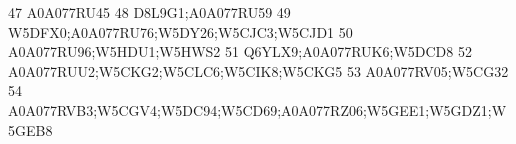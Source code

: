 \documentclass{beamer}
\begin{document}
\begin{frame}[fragile]
\begin{itemize}
\begin{Schunk}
\begin{Soutput}
47                                                                                                                                                                                                                                                                                                                                                                     A0A077RU45
48                                                                                                                                                                                                                                                                                                                                                              D8L9G1;A0A077RU59
49                                                                                                                                                                                                                                                                                                                                         W5DFX0;A0A077RU76;W5DY26;W5CJC3;W5CJD1
50                                                                                                                                                                                                                                                                                                                                                       A0A077RU96;W5HDU1;W5HWS2
51                                                                                                                                                                                                                                                                                                                                                       Q6YLX9;A0A077RUK6;W5DCD8
52                                                                                                                                                                                                                                                                                                                                         A0A077RUU2;W5CKG2;W5CLC6;W5CIK8;W5CKG5
53                                                                                                                                                                                                                                                                                                                                                              A0A077RV05;W5CG32
54                                                                                                                                                                                                                                                                                                                A0A077RVB3;W5CGV4;W5DC94;W5CD69;A0A077RZ06;W5GEE1;W5GDZ1;W5GEB8

\end{Soutput}
\end{Schunk}
\end{itemize}
\end{frame}
\end{document}
